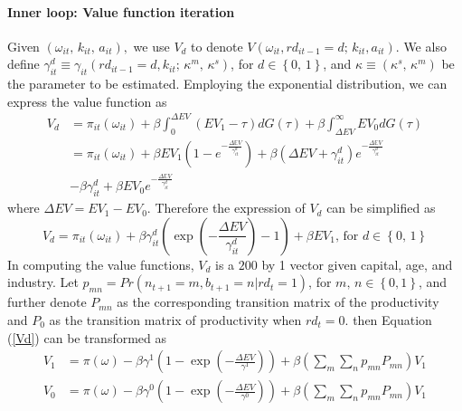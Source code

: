 \documentclass[11pt]{article}
\begin{document}
\paragraph{Inner loop: Value function iteration}

Given $\left(\omega_{it},\,k_{it},\,a_{it}\right),$ we use $V_{d}$
to denote $V\left(\omega_{it},rd_{it-1}=d;\,k_{it},a_{it}\right)$.
We also define $\gamma_{it}^{d}\equiv\gamma_{it}\left(rd_{it-1}=d,k_{it};\,\kappa^{m},\,\kappa^{s}\right)$,
for $d\in\left\{ 0,\,1\right\} $, and $\kappa\equiv\left(\kappa^{s},\,\kappa^{m}\right)$
be the parameter to be estimated. Employing the exponential distribution,
we can express the value function as 
\begin{align*}
V_{d} & =\pi_{it}\left(\omega_{it}\right)+\beta\int_{0}^{\Delta EV}\left(EV_{1}-\tau\right)dG\left(\tau\right)+\beta\int_{\Delta EV}^{\infty}EV{}_{0}dG\left(\tau\right)\\
 & =\pi_{it}\left(\omega_{it}\right)+\beta EV_{1}\left(1-e^{-\frac{\Delta\mathbb{E}V}{\gamma_{it}^{d}}}\right)+\beta\left(\Delta EV+\gamma_{it}^{d}\right)e^{-\frac{\Delta\mathbb{E}V}{\gamma_{it}^{d}}}\\
 & -\beta\gamma_{it}^{d}+\beta EV{}_{0}e^{-\frac{\Delta\mathbb{E}V}{\gamma_{it}^{d}}}
\end{align*}
where $\Delta EV=EV_{1}-EV_{0}$. Therefore the expression of $V_{d}$
can be simplified as 
\begin{equation}
V_{d}=\pi_{it}\left(\omega_{it}\right)+\beta\gamma_{it}^{d}\left(\exp\left(-\frac{\Delta EV}{\gamma_{it}^{d}}\right)-1\right)+\beta EV_{1},\,\text{for }d\in\left\{ 0,\,1\right\} \label{Vd}
\end{equation}
In computing the value functions, $V_{d}$ is a $200$ by 1 vector
given capital, age, and industry. Let $p_{mn}=Pr\left(n_{t+1}=m,b_{t+1}=n|rd_{t}=1\right)$,
for $m,\,n\in\left\{ 0,1\right\} $, and further denote $P_{mn}$
as the corresponding transition matrix of the productivity and $P_{0}$
as the transition matrix of productivity when $rd_{t}=0$. then Equation
(\ref{Vd}) can be transformed as 
\begin{align}
V_{1} & =\pi\left(\omega\right)-\beta\gamma^{1}\left(1-\exp\left(-\frac{\Delta EV}{\gamma^{1}}\right)\right)+\beta\left(\sum_{m}\sum_{n}p_{mn}P_{mn}\right)V_{1}\label{V1}\\
V_{0} & =\pi\left(\omega\right)-\beta\gamma^{0}\left(1-\exp\left(-\frac{\Delta EV}{\gamma^{0}}\right)\right)+\beta\left(\sum_{m}\sum_{n}p_{mn}P_{mn}\right)V_{1}\label{V0}
\end{align}
\end{document}

